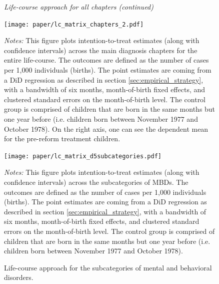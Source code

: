 \documentclass[11pt, a4paper, draft]{article} %
\begin{document}
\begin{figure}[H]\centering
		\begin{minipage}{\linewidth}\scriptsize
		\begin{center} \emph{Life-course approach for all chapters (continued)}\end{center}
	\end{minipage}
	\texttt{[image: paper/lc\_matrix\_chapters\_2.pdf]}
		\begin{minipage}{\linewidth}
		\scriptsize \emph{Notes:} This figure plots intention-to-treat estimates (along with confidence intervals) across the main diagnosis chapters for the entire life-course. The outcomes are defined as the number of cases per 1,000 individuals (births). The point estimates are coming from a DiD regression as described in section \ref{sec:empirical_strategy}, with a bandwidth of six months, month-of-birth fixed effects, and clustered standard errors on the month-of-birth level. The control group is comprised of children that are born in the same months but one year before (i.e. children born between November 1977 and October 1978). On the right axis, one can see the dependent mean for the pre-reform treatment children.
	\end{minipage}
\end{figure}
\begin{figure}[H]\centering
	\caption{Life-course approach for the subcategories of mental and behavioral disorders.}\label{fig: appendix_lc_matrix_d5_subcateg}
	\texttt{[image: paper/lc\_matrix\_d5subcategories.pdf]}
		\begin{minipage}{\linewidth}
		\scriptsize \emph{Notes:} This figure plots intention-to-treat estimates (along with confidence intervals) across the subcategories of MBDs. The outcomes are defined as the number of cases per 1,000 individuals (births). The point estimates are coming from a DiD regression as described in section \ref{sec:empirical_strategy}, with a bandwidth of six months, month-of-birth fixed effects, and clustered standard errors on the month-of-birth level. The control group is comprised of children that are born in the same months but one year before (i.e. children born between November 1977 and October 1978).
	\end{minipage}
\end{figure}

\renewcommand\thetable{A\arabic{table}}
\setcounter{table}{0} 
\end{document}
